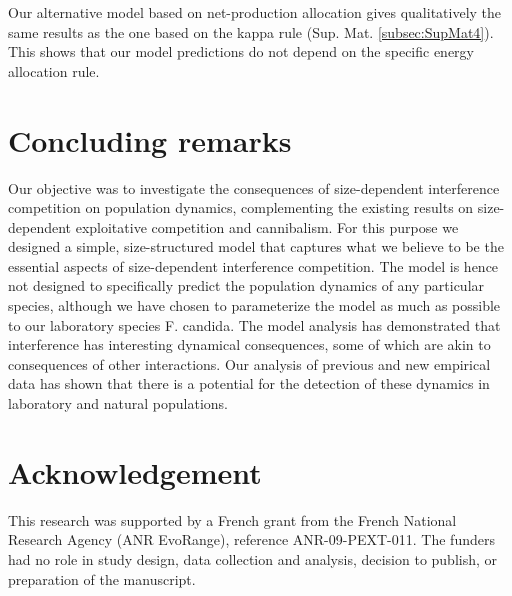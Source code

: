 Our alternative model based on net-production allocation gives qualitatively the
same results as the one based on the kappa rule (Sup. Mat. \ref{subsec:SupMat4}). This
shows that our model predictions do not depend on the specific energy allocation rule.

\section*{Concluding remarks}

Our objective was to investigate the consequences of size-dependent interference
competition on population dynamics, complementing the existing results on
size-dependent exploitative competition and cannibalism. For this purpose we
designed a simple, size-structured model that captures what we believe to be the
essential aspects of size-dependent interference competition. The model is hence
not designed to specifically predict the population dynamics of any particular
species, although we have chosen to parameterize the model as much as possible
to our laboratory species F. candida. The model analysis has demonstrated that
interference has interesting dynamical consequences, some of which are akin to
consequences of other interactions. Our analysis of previous and new empirical
data has shown that there is a potential for the detection of these dynamics in
laboratory and natural populations.

\section*{Acknowledgement} 
This research was supported by a French grant from
the French National Research Agency (ANR EvoRange), reference ANR-09-PEXT-011.
The funders had no role in study design, data collection and analysis, decision
to publish, or preparation of the manuscript.

\newpage



